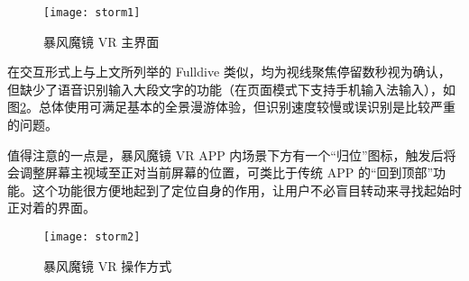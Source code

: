 \begin{figure}[htp]
\centering
\texttt{[image: storm1]}
\caption{暴风魔镜 VR 主界面}
\label{fig:storm1}
\end{figure}

在交互形式上与上文所列举的 Fulldive 类似，均为视线聚焦停留数秒视为确认，但缺少了语音识别输入大段文字的功能（在页面模式下支持手机输入法输入），如图\ref{fig:storm2}。总体使用可满足基本的全景漫游体验，但识别速度较慢或误识别是比较严重的问题。

值得注意的一点是，暴风魔镜 VR APP 内场景下方有一个“归位”图标，触发后将会调整屏幕主视域至正对当前屏幕的位置，可类比于传统 APP 的“回到顶部”功能。这个功能很方便地起到了定位自身的作用，让用户不必盲目转动来寻找起始时正对着的界面。

\begin{figure}[htp]
\centering
\texttt{[image: storm2]}
\caption{暴风魔镜 VR 操作方式}
\label{fig:storm2}
\end{figure}